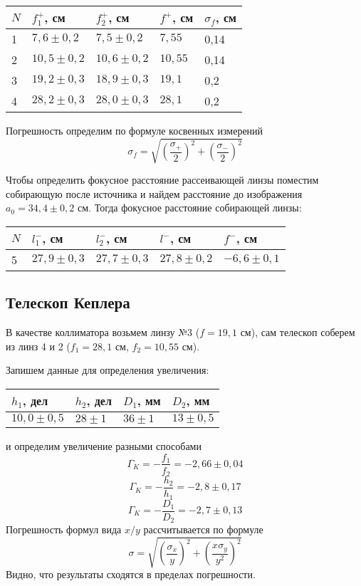 	\begin{table}[H]
		\centering
		\begin{tabular}{|l|l|l|l|l|}
			\hline
			$N$ & $f_1^+$, см  & $f_2^+$, см  & $f^+$, см & $\sigma_{f}$, см \\ \hline
			1   & $7,6\pm0,2$  & $7,5\pm0,2$  & $7,55$    & 0,14             \\ \hline
			2   & $10,5\pm0,2$ & $10,6\pm0,2$ & $10,55$   & 0,14             \\ \hline
			3   & $19,2\pm0,3$ & $18,9\pm0,3$ & $19,1$    & 0,2              \\ \hline
			4   & $28,2\pm0,3$ & $28,0\pm0,3$ & $28,1$    & 0,2              \\ \hline
		\end{tabular}
	\end{table} 
	Погрешность определим по формуле косвенных измерений
	\[
		\sigma_f = \sqrt{\left(\frac{\sigma_+}{2}\right)^2+\left(\frac{\sigma_-}{2}\right)^2}
	\]
	
	Чтобы определить фокусное расстояние рассеивающей линзы поместим собирающую после источника и найдем расстояние до изображения $a_0 = 34,4\pm0,2$ см. Тогда фокусное расстояние собирающей линзы:
	\begin{table}[H]
		\centering
		\begin{tabular}{|l|l|l|l|l|}
			\hline
			$N$ & $l_1^-$, см  & $l_2^-$, см  & $l^-$, см    & $f^-$, см   \\ \hline
			5   & $27,9\pm0,3$ & $27,7\pm0,3$ & $27,8\pm0,2$ & $-6,6\pm0,1$ \\ \hline
		\end{tabular}
	\end{table}

	\subsection{Телескоп Кеплера}
	В качестве коллиматора возьмем линзу №3 ($f=19,1$ см), сам телескоп соберем из линз 4 и 2 ($f_1=28,1$ см, $f_2=10,55$ см).
	
	Запишем данные для определения увеличения:
	\begin{table}[H]
		\centering
		\begin{tabular}{|l|l|l|l|}
			\hline
			$h_1$, дел   & $h_2$, дел & $D_1$, мм & $D_2$, мм  \\ \hline
			$10,0\pm0,5$ & $28\pm1$   & $36\pm1$  & $13\pm0,5$ \\ \hline
		\end{tabular}
	\end{table}
	и определим увеличение разными способами
	\[
		\Gamma_K=-\frac{f_1}{f_2} = -2,66\pm0,04
	\]
	\[
		\Gamma_K=-\frac{h_2}{h_1} = -2,8\pm0,17
	\]
	\[
		\Gamma_K=-\frac{D_1}{D_2} = -2,7\pm 0,13
	\]
	Погрешность формул вида $x/y$ рассчитывается по формуле
	\[
		\sigma = \sqrt{\left(\frac{\sigma_x}{y}\right)^2 + \left(\frac{x\sigma_y}{y^2}\right)^2}
	\]
	Видно, что результаты сходятся в пределах погрешности.
	
